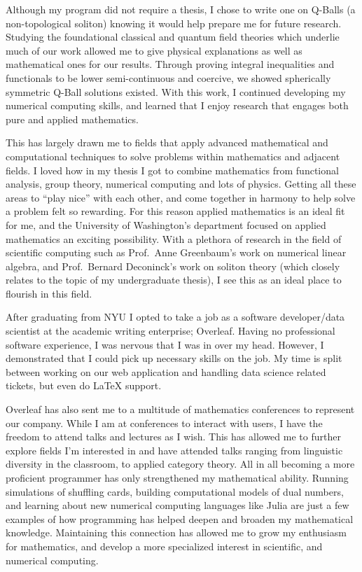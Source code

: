 \documentclass[11pt]{article}
\begin{document}
Although my program did not require a thesis, I chose to write one on Q-Balls (a non-topological soliton) knowing it would help prepare me for future research. Studying the foundational classical and quantum field theories which underlie much of our work allowed me to give physical explanations as well as mathematical ones for our results. Through proving integral inequalities and functionals to be lower semi-continuous and coercive, we showed spherically symmetric Q-Ball solutions existed. With this work, I continued developing my numerical computing skills, and learned that I enjoy research that engages both pure and applied mathematics.

This has largely drawn me to fields that apply advanced mathematical and computational techniques to solve problems within mathematics and adjacent fields. I loved how in my thesis I got to combine mathematics from functional analysis, group theory, numerical computing and lots of physics. Getting all these areas to ``play nice'' with each other, and come together in harmony to help solve a problem felt so rewarding. For this reason applied mathematics is an ideal fit for me, and the University of Washington's department focused on applied mathematics an exciting possibility. With a plethora of research in the field of scientific computing such as Prof.\ Anne Greenbaum's work on numerical linear algebra, and Prof.\ Bernard Deconinck's work on soliton theory (which closely relates to the topic of my undergraduate thesis), I see this as an ideal place to flourish in this field.

After graduating from NYU I opted to take a job as a software developer/data scientist at the academic writing enterprise; Overleaf. Having no professional software experience, I was nervous that I was in over my head. However, I demonstrated that I could pick up necessary skills on the job. My time is split between working on our web application and handling data science related tickets, but even do \LaTeX{} support.

Overleaf has also sent me to a multitude of mathematics conferences to represent our company. While I am at conferences to interact with users, I have the freedom to attend talks and lectures as I wish. This has allowed me to further explore fields I'm interested in and have attended talks ranging from linguistic diversity in the classroom, to applied category theory. All in all becoming a more proficient programmer has only strengthened my mathematical ability. Running simulations of shuffling cards, building computational models of dual numbers, and learning about new numerical computing languages like Julia are just a few examples of how programming has helped deepen and broaden my mathematical knowledge. Maintaining this connection has allowed me to grow my enthusiasm for mathematics, and develop a more specialized interest in scientific, and numerical computing.
\end{document}

